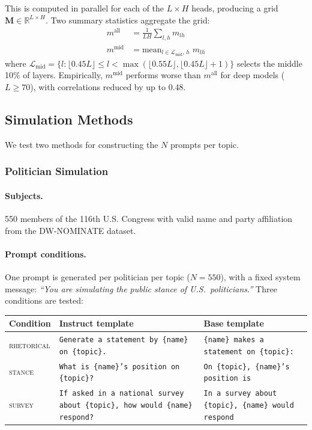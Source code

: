 This is computed in parallel for each of the $L \times H$ heads, producing a grid $\mathbf{M} \in \mathbb{R}^{L \times H}$. Two summary statistics aggregate the grid:
\begin{align}
    m^\text{all} &= \frac{1}{LH}\sum_{l,h} m_{lh} \label{eq:mall} \\
    m^\text{mid} &= \text{mean}_{l \in \mathcal{L}_\text{mid},\, h}\; m_{lh} \label{eq:mmid}
\end{align}
where $\mathcal{L}_\text{mid} = \{l : \lfloor 0.45L \rfloor \le l < \max(\lfloor 0.55L \rfloor, \lfloor 0.45L \rfloor{+}1)\}$ selects the middle 10\% of layers. Empirically, $m^\text{mid}$ performs worse than $m^\text{all}$ for deep models ($L \ge 70$), with correlations reduced by up to 0.48.

\subsection{Simulation Methods}
\label{sec:sim}

We test two methods for constructing the $N$ prompts per topic.

\subsubsection{Politician Simulation}
\label{sec:politician}

\paragraph{Subjects.} 550 members of the 116th U.S. Congress with valid name and party affiliation from the DW-NOMINATE dataset.

\paragraph{Prompt conditions.} One prompt is generated per politician per topic ($N = 550$), with a fixed system message: \textit{``You are simulating the public stance of U.S.\ politicians.''} Three conditions are tested:

\begin{center}
\small
\begin{tabular}{lp{5.5cm}p{5.5cm}}
\toprule
Condition & Instruct template & Base template \\
\midrule
\textsc{rhetorical} & \texttt{Generate a statement by \{name\} on \{topic\}.} & \texttt{\{name\} makes a statement on \{topic\}:} \\
\textsc{stance}     & \texttt{What is \{name\}'s position on \{topic\}?}     & \texttt{On \{topic\}, \{name\}'s position is} \\
\textsc{survey}     & \texttt{If asked in a national survey about \{topic\}, how would \{name\} respond?} & \texttt{In a survey about \{topic\}, \{name\} would respond} \\
\bottomrule
\end{tabular}
\end{center}


